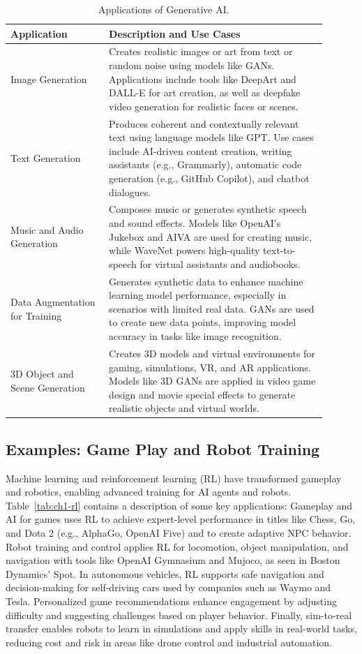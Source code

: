 \begin{table}[h]
\centering
\begin{tabular}{p{0.28\linewidth} p{0.62\linewidth}}
\toprule
\textbf{Application} & \textbf{Description and Use Cases} \\
\midrule
Image Generation &
Creates realistic images or art from text or random noise
using models like GANs. Applications include tools like
DeepArt and DALL-E for art creation, as well as deepfake
video generation for realistic faces or scenes. \\
\midrule
Text Generation &
Produces coherent and contextually relevant text using language
models like GPT. Use cases include AI-driven content creation, writing assistants (e.g., Grammarly), automatic
code generation (e.g., GitHub Copilot), and chatbot
dialogues. \\
\midrule
Music and Audio Generation &
Composes music or generates synthetic speech and sound
effects. Models like OpenAI's Jukebox and AIVA are used
for creating music, while WaveNet powers high-quality text-to-speech
for virtual assistants and audiobooks. \\
\midrule
Data Augmentation for Training &
Generates synthetic data to enhance machine learning model
performance, especially in scenarios with limited real data.
GANs are used to create new data points, improving model
accuracy in tasks like image recognition. \\
\midrule
3D Object and Scene Generation &
Creates 3D models and virtual environments for gaming, simulations,
VR, and AR applications. Models like 3D GANs
are applied in video game design and movie special effects to
generate realistic objects and virtual worlds. \\
\bottomrule
\end{tabular}
\caption{Applications of Generative AI.}
\label{tab:ch1-genai}
\end{table}

\subsection{Examples: Game Play and Robot Training}
\label{sec:ch1-rl}

Machine learning and reinforcement learning (RL) have transformed gameplay
and robotics, enabling advanced training for AI agents and robots. Table~\ref{tab:ch1-rl}
contains a description of some key applications: Gameplay and AI for games
uses RL to achieve expert-level performance in titles like Chess, Go, and Dota
2 (e.g., AlphaGo, OpenAI Five) and to create adaptive NPC behavior. Robot
training and control applies RL for locomotion, object manipulation, and navigation
with tools like OpenAI Gymnasium and Mujoco, as seen in Boston
Dynamics' Spot. In autonomous vehicles, RL supports safe navigation and
decision-making for self-driving cars used by companies such as Waymo and
Tesla. Personalized game recommendations enhance engagement by adjusting
difficulty and suggesting challenges based on player behavior. Finally, sim-to-real
transfer enables robots to learn in simulations and apply skills in real-world
tasks, reducing cost and risk in areas like drone control and industrial
automation.

